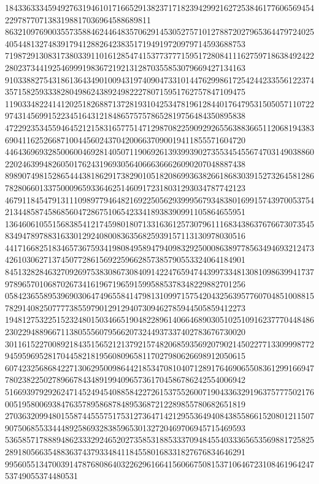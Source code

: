 \documentclass[10pt,
b5paper,
fleqn,
dvipdfmx,
uplatex
]{jsarticle}
\begin{document}
1843363334594927631946101716652913823717182394299216272538461776065694542297877071383198817036964588689811\\86321097690035573588462446483570629145305275710127887202796536447972402540544813274839179412882642383517194919720979714593688753\\71987291308317380339110161285474153773777159517280841116275971863849242228023734419254699919836721921312870355853079669427134163\\91033882754318613643490100943197409047331014476299861725424423355612237435715825933382804986243892498222780715951762757847109475\\11903348224141202518268871372819310425347819612844017647953150505711072297431456991522345164312184865757578652819756484350895838\\47229235345594645212158316577514712987082259092926556388366511206819438369041162526687100445602437042006637090019411855571604720\\44643696932850060046928140507119069261393993902735534545567470314903886022024639948260501762431969305640666366626090207048887438\\89890749815286544438186291738290105182086993638266186830391527326458128678280660133750009659336462514609172318031293034787742123\\46791184547913111098977946482169225056293999567934838016991574397005375421344858745868560472867510654233418938390991105864655951\\13646061055156838541217459801807133163612573079611168343863767667307354583494789788316330129240800836356825939157113130978030516\\44171668251834657367593419808495894794098329250008638977856349469321247342610306271374507728615692259662857385790553324064184901\\84513282846327092697538308673084091422476594744399733481308109863994173797896570106870267341619671965915995885378348229882701256\\05842365589539690306474965584147981310997157542043256395776070485100881578291408250777738559790129129407309462785944505859412273\\19481275322515232480150346651904822896140664689030510251091623777044848623022948896671138055560795662073244937337402783676730020\\30116152270089218435156521213792157482068593569207902145022771330999877294595969528170445821819560809658117027980626698912050615\\60742325686842271306295009864421853470810407128917646906550836129916694778023822502789667843489199409657361704586786242554006942\\51669397929262471452494540885842272615375526007190433632919637577750217600519580069384763578958687848953687212289855780682651819\\27036320994801558744555751753127364714212955364940843855866152080121150790750685533444892586932838596530132720469706945715469593\\53658571788894862333292465202735853188533370948455403336565356988172582528918056635488363743793348411845580168331827676834646291\\99560551347003914787680864032262961664156066750815371064672310846196424753749055374480531
\end{document}
